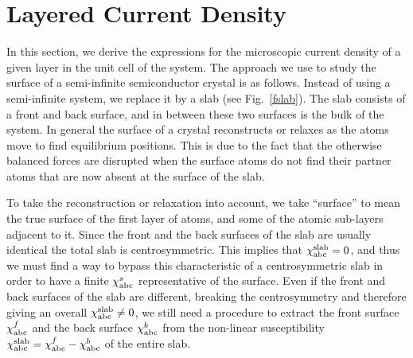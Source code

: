 \documentclass[floatfix,prb,aps,superscriptaddress,11pt,preprint,letterpaper]{revtex4}
\begin{document}
\section{Layered Current Density}\label{cd}

In this section, we derive the expressions for the microscopic current
density of a given layer in the unit cell of the system.
The approach we use to study the surface of a semi-infinite
semiconductor crystal is as follows. Instead of using a
semi-infinite system, we replace it by a slab (see Fig.~\ref{fslab}).
The slab consists of a front and back surface, and in between these
two surfaces is the bulk of the system. 
In general the surface of a crystal reconstructs or relaxes as the atoms
move to find equilibrium positions. This is due to the fact that
the otherwise
balanced forces are disrupted when the surface atoms do not find their 
partner atoms that are now absent at the surface of the slab. 

To take the reconstruction or relaxation into account, we take ``surface'' to mean
the true surface of the first layer of atoms, and
some of the atomic sub-layers adjacent to it.
Since the front and the back
surfaces of the slab are usually identical the total slab is
centrosymmetric. This implies that 
$\chi^{\mathrm{slab}}_{\mathrm{a}\mathrm{b}\mathrm{c}}=0$, and thus we must
find a way to bypass this characteristic of a centrosymmetric slab 
in order to have a finite $\chi^s_{\mathrm{a}\mathrm{b}\mathrm{c}}$ representative of the
surface. Even if the front and back surfaces of the slab 
are different, breaking the centrosymmetry and therefore giving an
overall $\chi^{\mathrm{slab}}_{\mathrm{a}\mathrm{b}\mathrm{c}}\ne 0$, we still
need a procedure to extract the front surface $\chi^f_{\mathrm{a}\mathrm{b}\mathrm{c}}$
and the back surface $\chi^b_{\mathrm{a}\mathrm{b}\mathrm{c}}$ from the non-linear
susceptibility 
$\chi^{\mathrm{slab}}_{\mathrm{a}\mathrm{b}\mathrm{c}}=\chi^f_{\mathrm{a}\mathrm{b}\mathrm{c}}-\chi^b_{\mathrm{a}\mathrm{b}\mathrm{c}}$
 of the entire slab.
\end{document}
